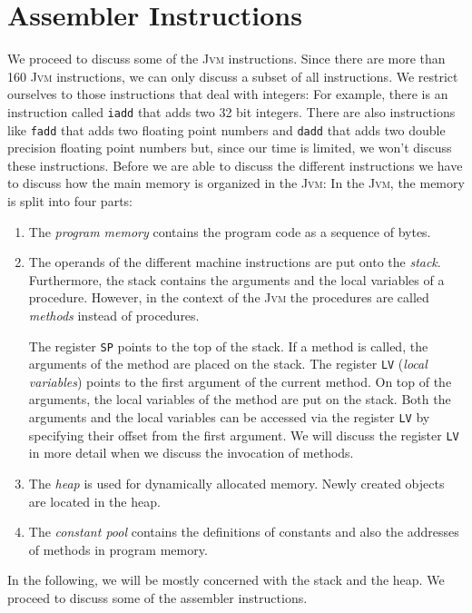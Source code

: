 \section{Assembler Instructions}
We proceed to discuss some of the \textsc{Jvm} instructions.  Since there are more than 160
\textsc{Jvm} instructions, we can only discuss a subset of all instructions.  We restrict ourselves to those
instructions that deal with integers:  For example, there is an instruction called \texttt{iadd} that adds
two 32 bit integers.  There are also instructions like \texttt{fadd} that adds two floating point
numbers and \texttt{dadd} that adds two double precision floating point numbers but, since our time
is limited, we won't discuss these instructions.  Before we are able to discuss the different
instructions we have to discuss how the main memory is organized in the \textsc{Jvm}: In the
\textsc{Jvm}, the memory is split into four parts: 
\begin{enumerate}
\item The \emph{program memory} contains the program code as a sequence of bytes.
\item The operands of the different machine instructions are put onto the \emph{stack}.
      Furthermore, the stack contains the arguments and the local variables of a procedure.
      However, in the context of the \textsc{Jvm} the procedures are called \emph{methods} instead
      of procedures.

      The register \texttt{SP} points to the top of the stack.
      If a method is called, the arguments of the method are placed on the stack.  
      The register \texttt{LV} (\emph{local variables}) points to the first argument of the current  
      method.    On top of the arguments, the local variables of the method are put on the stack.
      Both the arguments and the local variables can be accessed via the register \texttt{LV}
      by specifying their offset from the first argument.
      We will discuss the register \texttt{LV} in more detail when we discuss the invocation of methods. 
\item The \emph{heap} is used for dynamically allocated memory.  Newly created objects are
      located in the heap.
\item The \emph{constant pool} contains the definitions of constants and also the addresses of
      methods in program memory.
\end{enumerate}
In the following, we will be mostly concerned with the stack and the heap.
We proceed to discuss some of the assembler instructions.

